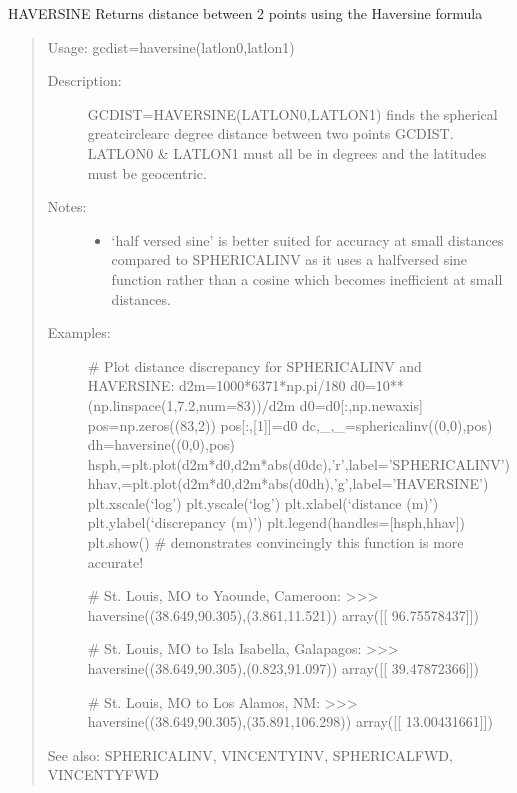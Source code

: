 \documentclass[letterpaper,10pt,english]{sphinxmanual}
\begin{document}
\begin{fulllineitems}
\label{\detokenize{infrapy.utils:infrapy.utils.latlon.haversine}}
HAVERSINE    Returns distance between 2 points using the Haversine formula
\begin{quote}

Usage:    gcdist=haversine(latlon0,latlon1)
\begin{description}
\item[{Description:}] \leavevmode
GCDIST=HAVERSINE(LATLON0,LATLON1) finds the spherical great\sphinxhyphen{}circle\sphinxhyphen{}arc
degree distance between two points GCDIST.  LATLON0 \& LATLON1 must all
be in degrees and the latitudes must be geocentric.

\item[{Notes:}] \leavevmode\begin{itemize}
\item {} 
‘half versed sine’ is better suited for accuracy at small distances
compared to SPHERICALINV as it uses a half\sphinxhyphen{}versed sine function
rather than a cosine which becomes inefficient at small distances.

\end{itemize}

\item[{Examples:}] \leavevmode
\# Plot distance discrepancy for SPHERICALINV and HAVERSINE:
d2m=1000*6371*np.pi/180
d0=10**(np.linspace(\sphinxhyphen{}1,7.2,num=83))/d2m
d0=d0{[}:,np.newaxis{]}
pos=np.zeros((83,2))
pos{[}:,{[}1{]}{]}=d0
dc,\_,\_=sphericalinv((0,0),pos)
dh=haversine((0,0),pos)
hsph,=plt.plot(d2m*d0,d2m*abs(d0\sphinxhyphen{}dc),’r’,label=’SPHERICALINV’)
hhav,=plt.plot(d2m*d0,d2m*abs(d0\sphinxhyphen{}dh),’g’,label=’HAVERSINE’)
plt.xscale(‘log’)
plt.yscale(‘log’)
plt.xlabel(‘distance (m)’)
plt.ylabel(‘discrepancy (m)’)
plt.legend(handles={[}hsph,hhav{]})
plt.show()
\# demonstrates convincingly this function is more accurate!

\# St. Louis, MO to Yaounde, Cameroon:
\textgreater{}\textgreater{}\textgreater{} haversine((38.649,\sphinxhyphen{}90.305),(3.861,11.521))
array({[}{[} 96.75578437{]}{]})

\# St. Louis, MO to Isla Isabella, Galapagos:
\textgreater{}\textgreater{}\textgreater{} haversine((38.649,\sphinxhyphen{}90.305),(\sphinxhyphen{}0.823,\sphinxhyphen{}91.097))
array({[}{[} 39.47872366{]}{]})

\# St. Louis, MO to Los Alamos, NM:
\textgreater{}\textgreater{}\textgreater{} haversine((38.649,\sphinxhyphen{}90.305),(35.891,\sphinxhyphen{}106.298))
array({[}{[} 13.00431661{]}{]})

\end{description}

See also: SPHERICALINV, VINCENTYINV, SPHERICALFWD, VINCENTYFWD
\end{quote}

\end{fulllineitems}
\end{document}
